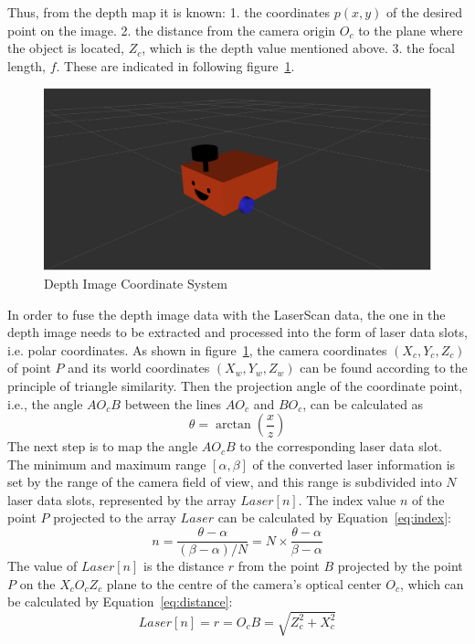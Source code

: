 Thus, from the depth map it is known: 
1. the coordinates $p(x, y)$ of the desired point on the image. 
2. the distance from the camera origin $O_c$ to the plane where the object is located, $Z_c$, which is the depth value mentioned above. 
3. the focal length, $f$. These are indicated in following figure~\ref{fig:depth_coordinate}.
\begin{figure}[H]
    \centering
    \includegraphics[width=0.8\linewidth]{figs/robot.png}
    \caption{Depth Image Coordinate System}
    \label{fig:depth_coordinate}
\end{figure}
In order to fuse the depth image data with the LaserScan data, 
the one in the depth image needs to be extracted and processed into the form of laser data slots, i.e. polar coordinates. 
As shown in figure~\ref{fig:depth_coordinate}, the camera coordinates $(X_c, Y_c, Z_c)$ of point $P$ and its world coordinates $(X_w, Y_w, Z_w)$ 
can be found according to the principle of triangle similarity. 
Then the projection angle of the coordinate point, i.e., the angle $AO_cB$ between the lines $AO_c$ and $BO_c$, can be calculated as 
\begin{equation}
    \theta=\arctan{(\frac{x}{z})}
\end{equation}
The next step is to map the angle $AO_cB$ to the corresponding laser data slot. 
The minimum and maximum range $[\alpha, \beta]$ of the converted laser information is set by the range of the camera field of view, 
and this range is subdivided into $N$ laser data slots, represented by the array $Laser[n]$. 
The index value $n$ of the point $P$ projected to the array $Laser$ can be calculated by Equation~\ref{eq:index}:
\begin{equation}
    n=\frac{\theta-\alpha}{(\beta-\alpha)/N}=N\times\frac{\theta-\alpha}{\beta-\alpha}
    \label{eq:index}
\end{equation}
The value of $Laser[n]$ is the distance $r$ from the point $B$ projected 
by the point $P$ on the $X_cO_cZ_c$ plane to the centre of the camera's optical center $O_c$, 
which can be calculated by Equation~\ref{eq:distance}:
\begin{equation}
    Laser[n]=r=O_cB=\sqrt{Z_c^2+X_c^2}
    \label{eq:distance}
\end{equation}

